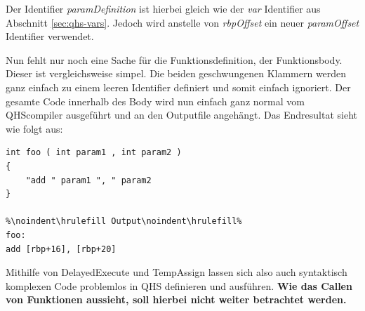 Der Identifier \textit{paramDefinition} ist hierbei gleich wie der \textit{var} Identifier aus Abschnitt \ref{sec:qhs-vars}. Jedoch wird anstelle von \textit{rbpOffset} ein neuer \textit{paramOffset} Identifier verwendet.

Nun fehlt nur noch eine Sache für die Funktionsdefinition, der Funktionsbody. Dieser ist vergleichsweise simpel. Die beiden geschwungenen Klammern werden ganz einfach zu einem leeren Identifier definiert und somit einfach ignoriert.
Der gesamte Code innerhalb des Body wird nun einfach ganz normal vom QHScompiler ausgeführt und an den Outputfile angehängt. Das Endresultat sieht wie folgt aus:

\begin{lstlisting}[language=QHS, caption=Finale Definition einer Funktion in QHS]
int foo ( int param1 , int param2 )
{
    "add " param1 ", " param2
}

%\noindent\hrulefill Output\noindent\hrulefill%
foo:
add [rbp+16], [rbp+20]
\end{lstlisting}

Mithilfe von DelayedExecute und TempAssign lassen sich also auch syntaktisch komplexen Code problemlos in QHS definieren und ausführen.
\textbf{Wie das Callen von Funktionen aussieht, soll hierbei nicht weiter betrachtet werden.}


    






